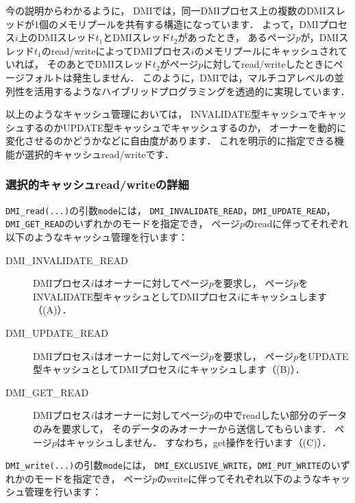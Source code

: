 \documentclass[report,12pt]{jsbook}
\begin{document}
今の説明からわかるように，
DMIでは，同一DMIプロセス上の複数のDMIスレッドが1個のメモリプールを共有する構造になっています．
よって，DMIプロセス$i$上のDMIスレッド$t_1$とDMIスレッド$t_2$があったとき，
あるページ$p$が，DMIスレッド$t_1$のread/writeによってDMIプロセス$i$のメモリプールにキャッシュされていれば，
そのあとでDMIスレッド$t_2$がページ$p$に対してread/writeしたときにページフォルトは発生しません．
このように，DMIでは，マルチコアレベルの並列性を活用するようなハイブリッドプログラミングを透過的に実現しています．

以上のようなキャッシュ管理においては，
INVALIDATE型キャッシュでキャッシュするのかUPDATE型キャッシュでキャッシュするのか，
オーナーを動的に変化させるのかどうかなどに自由度があります．
これを明示的に指定できる機能が選択的キャッシュread/writeです．

\subsubsection{選択的キャッシュread/writeの詳細}

\texttt{DMI\_read(...)}の引数\texttt{mode}には，
\texttt{DMI\_INVALIDATE\_READ}，\texttt{DMI\_UPDATE\_READ}，\texttt{DMI\_GET\_READ}のいずれかのモードを指定でき，
ページ$p$のreadに伴ってそれぞれ以下のようなキャッシュ管理を行います：

\begin{description}
\item[DMI\_INVALIDATE\_READ] DMIプロセス$i$はオーナーに対してページ$p$を要求し，
  ページ$p$をINVALIDATE型キャッシュとしてDMIプロセス$i$にキャッシュします（(A)）．
\item[DMI\_UPDATE\_READ] DMIプロセス$i$はオーナーに対してページ$p$を要求し，
  ページ$p$をUPDATE型キャッシュとしてDMIプロセス$i$にキャッシュします（(B)）．
\item[DMI\_GET\_READ] DMIプロセス$i$はオーナーに対してページ$p$の中でreadしたい部分のデータのみを要求して，
  そのデータのみオーナーから送信してもらいます．
  ページ$p$はキャッシュしません．
  すなわち，get操作を行います（(C)）．
\end{description}

\texttt{DMI\_write(...)}の引数\texttt{mode}には，
\texttt{DMI\_EXCLUSIVE\_WRITE}，\texttt{DMI\_PUT\_WRITE}のいずれかのモードを指定でき，
ページ$p$のwriteに伴ってそれぞれ以下のようなキャッシュ管理を行います：
\end{document}
